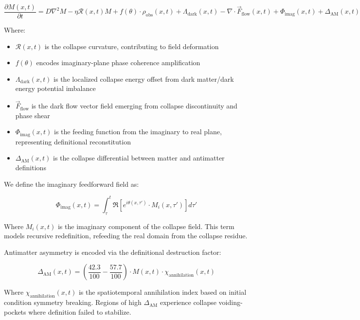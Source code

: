 \begin{equation}
\frac{\partial M(x,t)}{\partial t} = D \nabla^2 M - \eta \mathcal{R}(x,t) M + f(\theta) \cdot \rho_{\text{obs}}(x,t) + \Lambda_{\text{dark}}(x,t) - \nabla \cdot \vec{F}_{\text{flow}}(x,t) + \Phi_{\text{imag}}(x,t) + \Delta_{\text{AM}}(x,t)
\end{equation}

Where:
\begin{itemize}
  \item $\mathcal{R}(x,t)$ is the collapse curvature, contributing to field deformation
  \item $f(\theta)$ encodes imaginary-plane phase coherence amplification\cite{tHooft_determinism}
  \item $\Lambda_{\text{dark}}(x,t)$ is the localized collapse energy offset from dark matter/dark energy potential imbalance
  \item $\vec{F}_{\text{flow}}$ is the dark flow vector field emerging from collapse discontinuity and phase shear
  \item $\Phi_{\text{imag}}(x,t)$ is the feeding function from the imaginary to real plane, representing definitional reconstitution
  \item $\Delta_{\text{AM}}(x,t)$ is the collapse differential between matter and antimatter definitions
\end{itemize}

We define the imaginary feedforward field as:

\begin{equation}
\Phi_{\text{imag}}(x,t) = \int_\tau^t \Re\left[ e^{i \theta(x,\tau')} \cdot M_i(x,\tau') \right] d\tau'
\end{equation}

Where $M_i(x,t)$ is the imaginary component of the collapse field. This term models recursive redefinition, refeeding the real domain from the collapse residue.

Antimatter asymmetry is encoded via the definitional destruction factor:

\begin{equation}
\Delta_{\text{AM}}(x,t) = \left( \frac{42.3}{100} - \frac{57.7}{100} \right) \cdot M(x,t) \cdot \chi_{\text{annihilation}}(x,t)
\end{equation}

Where $\chi_{\text{annihilation}}(x,t)$ is the spatiotemporal annihilation index based on initial condition symmetry breaking. Regions of high $\Delta_{\text{AM}}$ experience collapse voiding-pockets where definition failed to stabilize.

